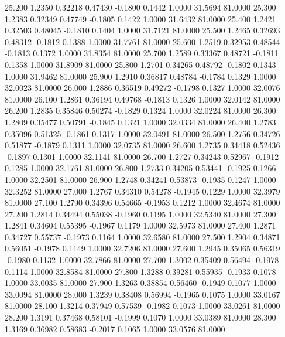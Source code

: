  25.200   1.2350   0.32218   0.47430  -0.1800   0.1442   1.0000  31.5694  81.0000
  25.300   1.2383   0.32349   0.47749  -0.1805   0.1422   1.0000  31.6432  81.0000
  25.400   1.2421   0.32503   0.48045  -0.1810   0.1404   1.0000  31.7121  81.0000
  25.500   1.2465   0.32693   0.48312  -0.1812   0.1388   1.0000  31.7761  81.0000
  25.600   1.2519   0.32953   0.48544  -0.1813   0.1372   1.0000  31.8354  81.0000
  25.700   1.2589   0.33367   0.48721  -0.1811   0.1358   1.0000  31.8909  81.0000
  25.800   1.2701   0.34265   0.48792  -0.1802   0.1343   1.0000  31.9462  81.0000
  25.900   1.2910   0.36817   0.48784  -0.1784   0.1329   1.0000  32.0023  81.0000
  26.000   1.2886   0.36519   0.49272  -0.1798   0.1327   1.0000  32.0076  81.0000
  26.100   1.2861   0.36194   0.49768  -0.1813   0.1326   1.0000  32.0142  81.0000
  26.200   1.2835   0.35846   0.50274  -0.1829   0.1324   1.0000  32.0224  81.0000
  26.300   1.2809   0.35477   0.50791  -0.1845   0.1321   1.0000  32.0334  81.0000
  26.400   1.2783   0.35096   0.51325  -0.1861   0.1317   1.0000  32.0491  81.0000
  26.500   1.2756   0.34726   0.51877  -0.1879   0.1311   1.0000  32.0735  81.0000
  26.600   1.2735   0.34418   0.52436  -0.1897   0.1301   1.0000  32.1141  81.0000
  26.700   1.2727   0.34243   0.52967  -0.1912   0.1285   1.0000  32.1761  81.0000
  26.800   1.2733   0.34205   0.53441  -0.1925   0.1266   1.0000  32.2501  81.0000
  26.900   1.2748   0.34241   0.53873  -0.1935   0.1247   1.0000  32.3252  81.0000
  27.000   1.2767   0.34310   0.54278  -0.1945   0.1229   1.0000  32.3979  81.0000
  27.100   1.2790   0.34396   0.54665  -0.1953   0.1212   1.0000  32.4674  81.0000
  27.200   1.2814   0.34494   0.55038  -0.1960   0.1195   1.0000  32.5340  81.0000
  27.300   1.2841   0.34604   0.55395  -0.1967   0.1179   1.0000  32.5973  81.0000
  27.400   1.2871   0.34727   0.55737  -0.1973   0.1164   1.0000  32.6580  81.0000
  27.500   1.2904   0.34871   0.56051  -0.1978   0.1149   1.0000  32.7206  81.0000
  27.600   1.2945   0.35065   0.56319  -0.1980   0.1132   1.0000  32.7866  81.0000
  27.700   1.3002   0.35409   0.56494  -0.1978   0.1114   1.0000  32.8584  81.0000
  27.800   1.3288   0.39281   0.55935  -0.1933   0.1078   1.0000  33.0035  81.0000
  27.900   1.3263   0.38854   0.56460  -0.1949   0.1077   1.0000  33.0094  81.0000
  28.000   1.3239   0.38408   0.56994  -0.1965   0.1075   1.0000  33.0167  81.0000
  28.100   1.3214   0.37949   0.57539  -0.1982   0.1073   1.0000  33.0261  81.0000
  28.200   1.3191   0.37468   0.58101  -0.1999   0.1070   1.0000  33.0389  81.0000
  28.300   1.3169   0.36982   0.58683  -0.2017   0.1065   1.0000  33.0576  81.0000
